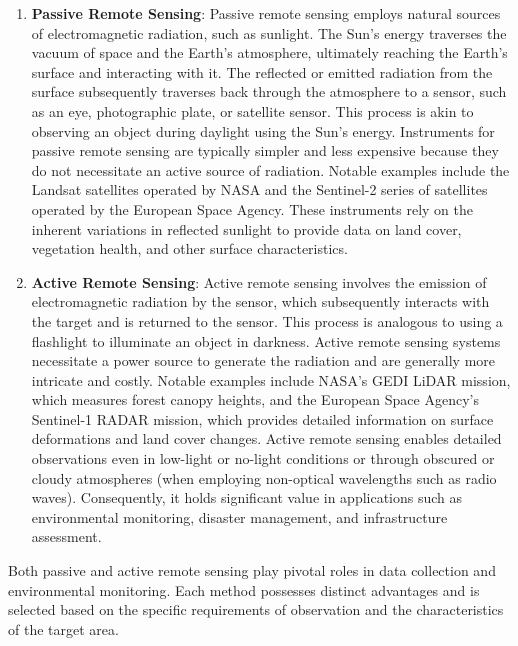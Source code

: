 \documentclass[
  12 pt,
]{Nemilov}
\begin{document}
\begin{enumerate}
\def\labelenumi{\arabic{enumi}.}
\item
  \textbf{Passive Remote Sensing}: Passive remote sensing employs natural sources of electromagnetic radiation, such as sunlight. The Sun's energy traverses the vacuum of space and the Earth's atmosphere, ultimately reaching the Earth's surface and interacting with it. The reflected or emitted radiation from the surface subsequently traverses back through the atmosphere to a sensor, such as an eye, photographic plate, or satellite sensor. This process is akin to observing an object during daylight using the Sun's energy. Instruments for passive remote sensing are typically simpler and less expensive because they do not necessitate an active source of radiation. Notable examples include the Landsat satellites operated by NASA and the Sentinel-2 series of satellites operated by the European Space Agency. These instruments rely on the inherent variations in reflected sunlight to provide data on land cover, vegetation health, and other surface characteristics.
\item
  \textbf{Active Remote Sensing}: Active remote sensing involves the emission of electromagnetic radiation by the sensor, which subsequently interacts with the target and is returned to the sensor. This process is analogous to using a flashlight to illuminate an object in darkness. Active remote sensing systems necessitate a power source to generate the radiation and are generally more intricate and costly. Notable examples include NASA's GEDI LiDAR mission, which measures forest canopy heights, and the European Space Agency's Sentinel-1 RADAR mission, which provides detailed information on surface deformations and land cover changes. Active remote sensing enables detailed observations even in low-light or no-light conditions or through obscured or cloudy atmospheres (when employing non-optical wavelengths such as radio waves). Consequently, it holds significant value in applications such as environmental monitoring, disaster management, and infrastructure assessment.
\end{enumerate}

Both passive and active remote sensing play pivotal roles in data collection and environmental monitoring. Each method possesses distinct advantages and is selected based on the specific requirements of observation and the characteristics of the target area.
\end{document}
